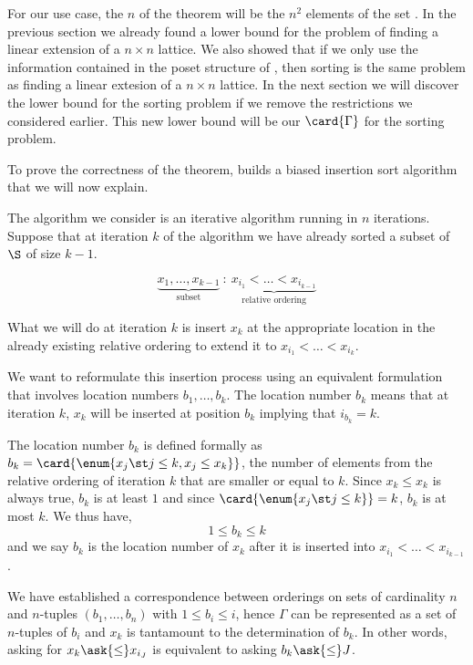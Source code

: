 For our use case, the $n$ of the theorem will be the $n^2$ elements of the set
\XY. In the previous section we already found a lower bound for the problem of
finding a linear extension of a \(n \times n\) lattice. We also showed that if
we only use the information contained in the poset structure of \XY, then
sorting \XY is the same problem as finding a linear extesion of a \(n \times
n\) lattice. In the next section we will discover the lower bound for the
sorting \XY problem if we remove the restrictions we considered earlier. This
new lower bound will be our $\card{\Gamma}$ for the sorting \XY problem.

To prove the correctness of the theorem, \citet{fredman:1976} builds a biased
insertion sort algorithm that we will now explain.

The algorithm we consider is an iterative algorithm running in \(n\)
iterations. Suppose that at iteration \(k\) of the algorithm we have already sorted a
subset of \(\S\) of size \(k-1\).

\begin{displaymath}
\underbrace{x_1, \ldots, x_{k-1}}_{\text{subset}}~:~\underbrace{x_{i_1} <
\ldots < x_{i_{k-1}}}_{\text{relative ordering}}
\end{displaymath}

What we will do at iteration $k$ is insert $x_k$ at the appropriate location
in the already existing relative ordering to extend it to $x_{i_1} < \ldots <
x_{i_k}$.

We want to reformulate this insertion process using an equivalent formulation
that involves location numbers $b_1, \ldots, b_k$. The location
number $b_k$ means that at iteration $k$, $x_k$ will be inserted at position
$b_k$ implying that $i_{b_k} = k$.

The location number $b_k$ is defined formally as $b_k = \card{\enum{x_j \st j
\le k, x_j \le x_k}}$, \ie the number of elements from the relative ordering
of iteration $k$ that are smaller or equal to $k$. Since $x_k \le x_k$ is
always true, $b_k$ is at least $1$ and since $\card{\enum{x_j \st j \le k}} =
k$, $b_k$ is at most $k$. We thus have,
$$ 1 \le b_k \le k$$
and we say $b_k$ is the location number of $x_k$ after it is inserted into
$x_{i_1} < \ldots < x_{i_{k-1}}$.

We have established a correspondence between orderings on sets of cardinality
$n$ and $n$-tuples $(b_1, \ldots, b_n)$ with $1 \le b_i \le i$, hence $\Gamma$
can be represented as a set of $n$-tuples of $b_i$ and $x_k$ is tantamount to
the determination of $b_k$. In other words, asking for $x_k \ask{\le} x_{i_J}$
is equivalent to asking $b_k \ask{\le} J$.


